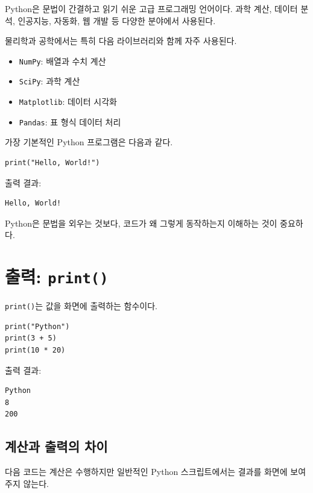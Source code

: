 \documentclass[11pt,a4paper]{article}
\begin{document}
Python은 문법이 간결하고 읽기 쉬운 고급 프로그래밍 언어이다.
과학 계산, 데이터 분석, 인공지능, 자동화, 웹 개발 등 다양한 분야에서 사용된다.

물리학과 공학에서는 특히 다음 라이브러리와 함께 자주 사용된다.

\begin{itemize}
    \item \texttt{NumPy}: 배열과 수치 계산
    \item \texttt{SciPy}: 과학 계산
    \item \texttt{Matplotlib}: 데이터 시각화
    \item \texttt{Pandas}: 표 형식 데이터 처리
\end{itemize}

가장 기본적인 Python 프로그램은 다음과 같다.

\begin{lstlisting}
print("Hello, World!")
\end{lstlisting}

출력 결과:

\begin{verbatim}
Hello, World!
\end{verbatim}

\begin{importantbox}
Python은 문법을 외우는 것보다, 코드가 왜 그렇게 동작하는지 이해하는 것이 중요하다.
\end{importantbox}

\section{출력: \texttt{print()}}

\texttt{print()}는 값을 화면에 출력하는 함수이다.

\begin{lstlisting}
print("Python")
print(3 + 5)
print(10 * 20)
\end{lstlisting}

출력 결과:

\begin{verbatim}
Python
8
200
\end{verbatim}

\subsection{계산과 출력의 차이}

다음 코드는 계산은 수행하지만 일반적인 Python 스크립트에서는 결과를 화면에 보여 주지 않는다.
\end{document}
